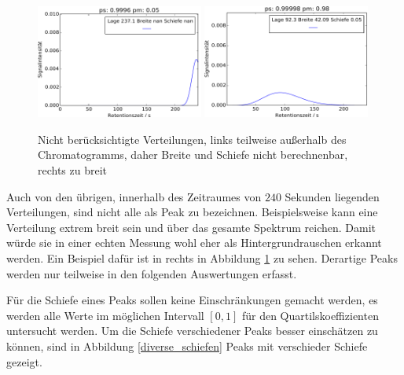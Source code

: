 \begin{figure}[H]
\includegraphics[width=0.49\textwidth]{bilder/outof240}
\includegraphics[width=0.49\textwidth]{bilder/huegel}
\caption[Nicht berücksichtigte Verteilungen]{Nicht berücksichtigte Verteilungen, links teilweise außerhalb des Chromatogramms, daher Breite und Schiefe nicht berechnenbar, rechts zu breit}
\label{kein_peak}
\end{figure}


Auch von den übrigen, innerhalb des Zeitraumes von $240$ Sekunden liegenden Verteilungen, sind nicht alle als Peak zu bezeichnen. Beispielsweise kann eine Verteilung extrem breit sein und über das gesamte Spektrum reichen. Damit würde sie in einer echten Messung wohl eher als Hintergrundrauschen erkannt werden. Ein Beispiel dafür ist in rechts in Abbildung \ref{kein_peak} zu sehen. Derartige Peaks werden nur teilweise in den folgenden Auswertungen erfasst.

Für die Schiefe eines Peaks sollen keine Einschränkungen gemacht werden, es werden alle Werte im möglichen Intervall $[0,1]$ für den Quartilskoeffizienten untersucht werden. Um die Schiefe verschiedener Peaks besser einschätzen zu können, sind in Abbildung \ref{diverse_schiefen} Peaks mit verschieder Schiefe gezeigt.

